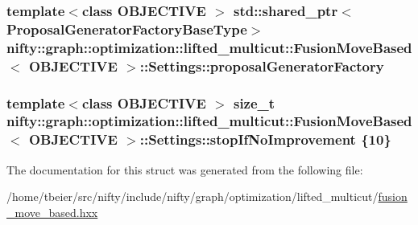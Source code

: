 \subsubsection[{proposal\+Generator\+Factory}]{\setlength{\rightskip}{0pt plus 5cm}template$<$class O\+B\+J\+E\+C\+T\+I\+V\+E $>$ std\+::shared\+\_\+ptr$<${\bf Proposal\+Generator\+Factory\+Base\+Type}$>$ {\bf nifty\+::graph\+::optimization\+::lifted\+\_\+multicut\+::\+Fusion\+Move\+Based}$<$ O\+B\+J\+E\+C\+T\+I\+V\+E $>$\+::Settings\+::proposal\+Generator\+Factory}\label{structnifty_1_1graph_1_1optimization_1_1lifted__multicut_1_1FusionMoveBased_1_1Settings_adfef4157f175b37293f49ff31d5ca8dc}
\hypertarget{structnifty_1_1graph_1_1optimization_1_1lifted__multicut_1_1FusionMoveBased_1_1Settings_a8f2f80046bc6f9887bdf936be099d4cb}{}
\subsubsection[{stop\+If\+No\+Improvement}]{\setlength{\rightskip}{0pt plus 5cm}template$<$class O\+B\+J\+E\+C\+T\+I\+V\+E $>$ size\+\_\+t {\bf nifty\+::graph\+::optimization\+::lifted\+\_\+multicut\+::\+Fusion\+Move\+Based}$<$ O\+B\+J\+E\+C\+T\+I\+V\+E $>$\+::Settings\+::stop\+If\+No\+Improvement \{10\}}\label{structnifty_1_1graph_1_1optimization_1_1lifted__multicut_1_1FusionMoveBased_1_1Settings_a8f2f80046bc6f9887bdf936be099d4cb}


The documentation for this struct was generated from the following file\+:\begin{DoxyCompactItemize}
\item 
/home/tbeier/src/nifty/include/nifty/graph/optimization/lifted\+\_\+multicut/\hyperlink{lifted__multicut_2fusion__move__based_8hxx}{fusion\+\_\+move\+\_\+based.\+hxx}\end{DoxyCompactItemize}
